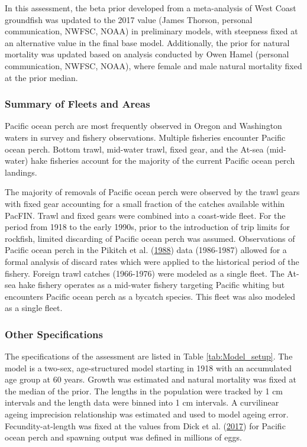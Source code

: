 \documentclass[12pt,]{article}
\begin{document}
In this assessment, the beta prior developed from a meta-analysis of
West Coast groundfish was updated to the 2017 value (James Thorson,
personal communication, NWFSC, NOAA) in preliminary models, with
steepness fixed at an alternative value in the final base model.
Additionally, the prior for natural mortality was updated based on
analysis conducted by Owen Hamel (personal communication, NWFSC, NOAA),
where female and male natural mortality fixed at the prior median.

\subsubsection{Summary of Fleets and
Areas}\label{summary-of-fleets-and-areas}

Pacific ocean perch are most frequently observed in Oregon and
Washington waters in survey and fishery observations. Multiple fisheries
encounter Pacific ocean perch. Bottom trawl, mid-water trawl, fixed
gear, and the At-sea (mid-water) hake fisheries account for the majority
of the current Pacific ocean perch landings.

The majority of removals of Pacific ocean perch were observed by the
trawl gears with fixed gear accounting for a small fraction of the
catches available within PacFIN. Trawl and fixed gears were combined
into a coast-wide fleet. For the period from 1918 to the early 1990s,
prior to the introduction of trip limits for rockfish, limited
discarding of Pacific ocean perch was assumed. Observations of Pacific
ocean perch in the Pikitch et al.
(\protect\hyperlink{ref-pikitch_evaluation_1988}{1988}) data (1986-1987)
allowed for a formal analysis of discard rates which were applied to the
historical period of the fishery. Foreign trawl catches (1966-1976) were
modeled as a single fleet. The At-sea hake fishery operates as a
mid-water fishery targeting Pacific whiting but encounters Pacific ocean
perch as a bycatch species. This fleet was also modeled as a single
fleet.

\subsubsection{Other Specifications}\label{other-specifications}

The specifications of the assessment are listed in Table
\ref{tab:Model_setup}. The model is a two-sex, age-structured model
starting in 1918 with an accumulated age group at 60 years. Growth was
estimated and natural mortality was fixed at the median of the prior.
The lengths in the population were tracked by 1 cm intervals and the
length data were binned into 1 cm intervals. A curvilinear ageing
imprecision relationship was estimated and used to model ageing error.
Fecundity-at-length was fixed at the values from Dick et al.
(\protect\hyperlink{ref-dick_meta-analysis_2017}{2017}) for Pacific
ocean perch and spawning output was defined in millions of eggs.
\end{document}
